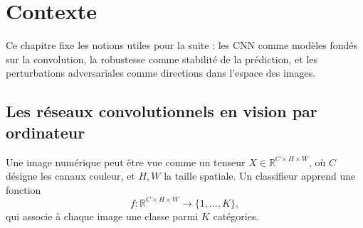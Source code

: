             
            
            
            
            





\chapter{Contexte}

Ce chapitre fixe les notions utiles pour la suite : les CNN comme modèles fondés sur la convolution, la robustesse comme stabilité de la prédiction, 
et les perturbations adversariales comme directions dans l'espace des images.

\section{Les réseaux convolutionnels en vision par ordinateur}

Une image numérique peut être vue comme un tenseur $X \in \mathbb{R}^{C \times H \times W}$, où $C$ désigne les canaux couleur, et $H,W$ 
la taille spatiale. Un classifieur apprend une fonction
\[
    f : \mathbb{R}^{C \times H \times W} \longrightarrow \{1,\ldots,K\},
\]
qui associe à chaque image une classe parmi $K$ catégories.

